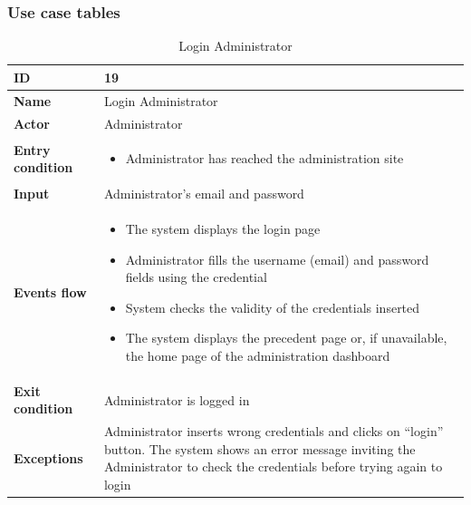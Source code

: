 \subsubsection*{Use case tables}
\begin{longtable}{p{} | p{}}
\caption{Login Administrator}
        \label{tab:login_administrator}\\
        \hline
        \textbf{ID} & 19\\
        \hline
        \textbf{Name}  &  Login Administrator \\
        \hline
        \textbf{Actor}  &  Administrator\\
        \hline
        \textbf{Entry condition}  &  
        \begin{itemize}
                \item Administrator has reached the administration site
         \end{itemize}\\
        \hline
        \textbf{Input}  & Administrator's email and password\\ 
        \hline
        \textbf{Events flow} & 
        \begin{itemize}
            
                \item The system displays the login page
                \item Administrator fills the username (email) and password fields using the credential
                \item System checks the validity of the credentials inserted
                \item The system displays the precedent page or, if unavailable, the home page of the administration dashboard
                 \end{itemize}
                 \\
        \hline
        \textbf{Exit condition} & Administrator is logged in\\
        \hline
        \textbf{Exceptions} & Administrator inserts wrong credentials and clicks on “login” button. The system shows an error message inviting the Administrator to check the credentials before trying again to login\\
        \hline
       
        
    \end{longtable}
    
